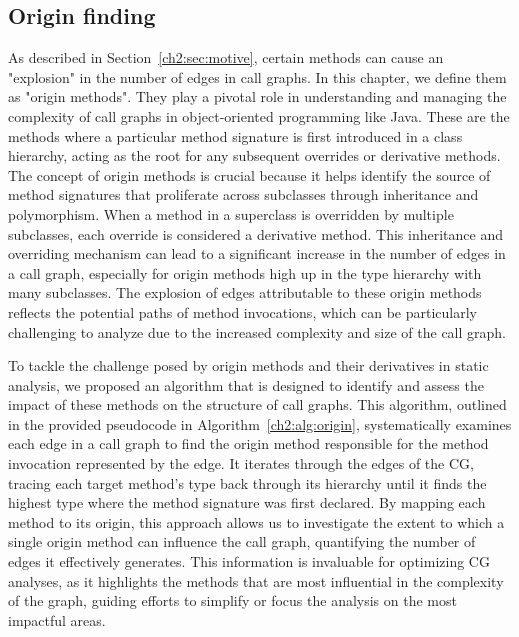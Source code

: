 \subsection{Origin finding}\label{ch2:subsec:origin}
As described in Section~\ref{ch2:sec:motive}, certain methods can cause an "explosion" in the number of edges in call graphs. In this chapter, we define them as "origin methods". They play a pivotal role in understanding and managing the complexity of call graphs in object-oriented programming like Java. These are the methods where a particular method signature is first introduced in a class hierarchy, acting as the root for any subsequent overrides or derivative methods. The concept of origin methods is crucial because it helps identify the source of method signatures that proliferate across subclasses through inheritance and polymorphism. When a method in a superclass is overridden by multiple subclasses, each override is considered a derivative method. This inheritance and overriding mechanism can lead to a significant increase in the number of edges in a call graph, especially for origin methods high up in the type hierarchy with many subclasses. The explosion of edges attributable to these origin methods reflects the potential paths of method invocations, which can be particularly challenging to analyze due to the increased complexity and size of the call graph.

To tackle the challenge posed by origin methods and their derivatives in static analysis, we proposed an algorithm that is designed to identify and assess the impact of these methods on the structure of call graphs. This algorithm, outlined in the provided pseudocode in Algorithm~\ref{ch2:alg:origin}, systematically examines each edge in a call graph to find the origin method responsible for the method invocation represented by the edge. It iterates through the edges of the CG, tracing each target method's type back through its hierarchy until it finds the highest type where the method signature was first declared. By mapping each method to its origin, this approach allows us to investigate the extent to which a single origin method can influence the call graph, quantifying the number of edges it effectively generates. This information is invaluable for optimizing CG analyses, as it highlights the methods that are most influential in the complexity of the graph, guiding efforts to simplify or focus the analysis on the most impactful areas.

